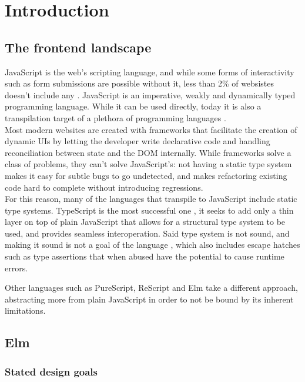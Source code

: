 \chapter{Introduction}
\setcounter{page}{1}

\section{The frontend landscape}
JavaScript is the web's scripting language, and while some forms of interactivity such as form submissions are possible without it, less than 2\% of websistes doesn't include any \cite{noauthor_usage_nodate}. JavaScript is an imperative, weakly and dynamically typed programming language. While it can be used directly, today it is also a transpilation target of a plethora of programming languages \cite{noauthor_list_nodate}.\\

Most modern websites are created with frameworks that facilitate the creation of dynamic UIs by letting the developer write declarative code and handling reconciliation between state and the DOM internally. While frameworks solve a class of problems, they can't solve JavaScript's: not having a static type system makes it easy for subtle bugs to go undetected, and makes refactoring existing code hard to complete without introducing regressions.\\

For this reason, many of the languages that transpile to JavaScript include static type systems. TypeScript is the most successful one \cite{noauthor_most_nodate}, it seeks to add only a thin layer on top of plain JavaScript that allows for a structural type system to be used, and provides seamless interoperation. Said type system is not sound, and making it sound is not a goal of the language \cite{noauthor_typescript_nodate}, which also includes escape hatches such as type assertions that when abused have the potential to cause runtime errors.

Other languages such as PureScript, ReScript and Elm take a different approach, abstracting more from plain JavaScript in order to not be bound by its inherent limitations.

\section{Elm}

\subsection{Stated design goals}
